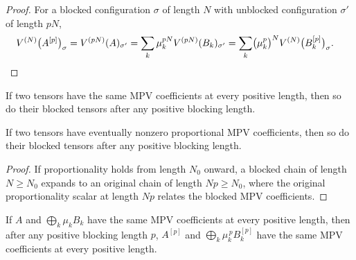 \begin{proof}\leanok
    For a blocked configuration $\sigma$ of length $N$ with unblocked
    configuration $\sigma'$ of length $pN$,
    \begin{align}
        V^{(N)}\bigl(A^{[p]}\bigr)_\sigma
         & =V^{(pN)}(A)_{\sigma'}
        =\sum_k\mu_k^{pN}V^{(pN)}(B_k)_{\sigma'}
        =\sum_k\bigl(\mu_k^p\bigr)^NV^{(N)}\bigl(B_k^{[p]}\bigr)_\sigma. \notag
    \end{align}
\end{proof}

\begin{lemma}%
    \label{thm:same_mpv2_pos_block_tensor}
    \leanok
    If two tensors have the same MPV coefficients at every positive length, then
    so do their blocked tensors after any positive blocking length.
\end{lemma}

\begin{lemma}%
    \label{thm:eventual_nonzero_proportional_mpv_blocking}
    \leanok
    If two tensors have eventually nonzero proportional MPV coefficients, then
    so do their blocked tensors after any positive blocking length.
\end{lemma}

\begin{proof}\leanok
    If proportionality holds from length $N_0$ onward, a blocked chain of length
    $N\ge N_0$ expands to an original chain of length $Np\ge N_0$, where the
    original proportionality scalar at length $Np$ relates the blocked MPV
    coefficients.
\end{proof}

\begin{lemma}%
    \label{thm:same_mpv2_pos_block_tensor_to_tensor_from_blocks}
    \leanok
    If $A$ and $\bigoplus_k\mu_kB_k$ have the same MPV coefficients at every
    positive length, then after any positive blocking length $p$, $A^{[p]}$ and
    $\bigoplus_k\mu_k^{\,p}B_k^{[p]}$ have the same MPV coefficients at every
    positive length.
\end{lemma}

